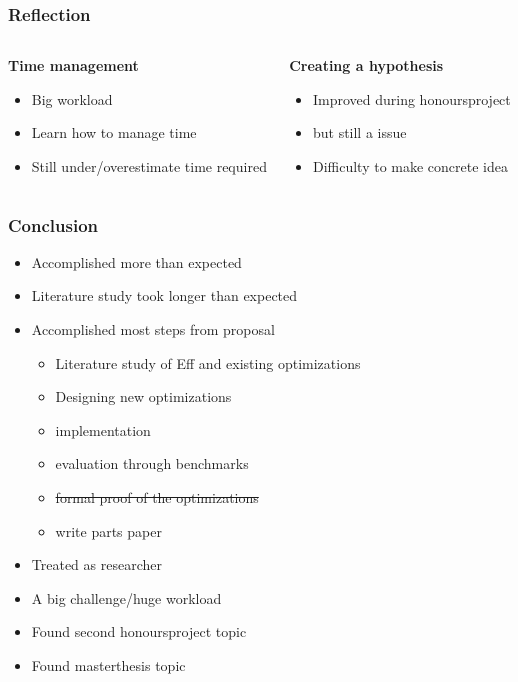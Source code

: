 \documentclass{beamer}
\begin{document}
\begin{frame}[fragile]
\frametitle{Reflection}

\begin{columns}[T] %
\begin{column}{.48\textwidth}

	\textbf{Time management}
	\begin{itemize}
	\item Big workload
	\item Learn how to manage time
	\item Still under/overestimate time required
	\end{itemize}
	
\end{column}%
\hfill%
\begin{column}{.48\textwidth}
	
	\textbf{Creating a hypothesis}
	\begin{itemize}
	\item Improved during honoursproject
	\item but still a issue
	\item Difficulty to make concrete idea
	\end{itemize}
	
\end{column}%
\end{columns}
\end{frame}



\begin{frame}[fragile]
\frametitle{Conclusion}
\begin{itemize}
	\item Accomplished more than expected
	\item Literature study took longer than expected
	\item Accomplished most steps from proposal
		\begin{itemize}
    		\item Literature study of Eff and existing optimizations
			\item Designing new optimizations
			\item implementation
			\item evaluation through benchmarks
			\item \sout{formal proof of the optimizations}
			\item write parts paper
		\end{itemize}
	\item Treated as researcher
	\item A big challenge/huge workload
	\item Found second honoursproject topic \cite{Hillerstrom:2016:LER:2976022.2976033}
	\item Found masterthesis topic
\end{itemize}
\end{frame}
\end{document}
